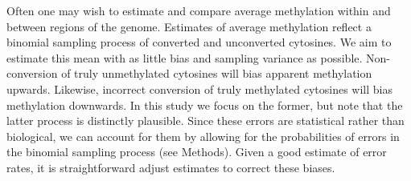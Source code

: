 \documentclass[10pt,letterpaper]{article}
\begin{document}
Often one may wish to estimate and compare average methylation within and between regions of the genome.
Estimates of average methylation reflect a binomial sampling process of converted and unconverted cytosines.
We aim to estimate this mean with as little bias and sampling variance as possible.
Non-conversion of truly unmethylated cytosines will bias apparent methylation upwards.
Likewise, incorrect conversion of truly methylated cytosines will bias methylation downwards.
In this study we focus on the former, but note that the latter process is distinctly plausible.
Since these errors are statistical rather than biological, we can account for them by allowing for the probabilities of errors in the binomial sampling process (see Methods).
Given a good estimate of error rates, it is straightforward adjust estimates to correct these biases.
\end{document}
